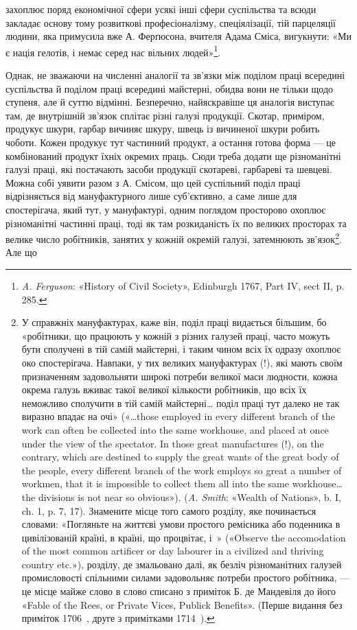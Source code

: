 \parcont{}  %
захоплює поряд економічної сфери усякі інші сфери суспільства
та всюди закладає основу тому розвиткові професіоналізму,
спеціялізації, тій парцеляції людини, яка примусила вже А. Ферґюсона,
вчителя Адама Сміса, вигукнути: «Ми є нація гелотів,
і немає серед нас вільних людей»\footnote{
\emph{A. Ferguson}: «History of Civil Society», Edinburgh 1767, Part IV,
sect II, p. 285.
}.

Однак, не зважаючи на численні аналогії та зв’язки між поділом
праці всередині суспільства й поділом праці всередині майстерні,
обидва вони не тільки щодо ступеня, але й суттю відмінні.
Безперечно, найяскравіше ця аналогія виступає там, де внутрішній
зв’язок сплітає різні галузі продукції. Скотар, приміром,
продукує шкури, гарбар вичиняє шкуру, швець із вичиненої
шкури робить чоботи. Кожен продукує тут частинний продукт,
а остання готова форма — це комбінований продукт їхніх окремих
праць. Сюди треба додати ще різноманітні галузі праці, які
постачають засоби продукції скотареві, гарбареві та шевцеві.
Можна собі уявити разом з А. Смісом, що цей суспільний поділ
праці відрізняється від мануфактурного лише суб’єктивно, а саме
лише для спостерігача, який тут, у мануфактурі, одним поглядом
просторово охоплює різноманітні частинні праці, тоді як там розкиданість
їх по великих просторах та велике число робітників,
занятих у кожній окремій галузі, затемнюють зв’язок\footnote{
У справжніх мануфактурах, каже він, поділ праці видається
більшим, бо «робітники, що працюють у кожній з різних галузей праці,
часто можуть бути сполучені в тій самій майстерні, і таким чином всіх
їх одразу охоплює око спостерігача. Навпаки, у тих великих мануфактурах
(!), які мають своїм призначенням задовольняти широкі потреби
великої маси людности, кожна окрема галузь вживає такої великої кількости
робітників, що всіх їх неможливо сполучити в тій самій майстерні\dots{}
поділ праці тут далеко не так виразно впадає на очі» («\dots{}those employed
in every different branch of the work can often be collected into the
same workhouse, and placed at once under the view of the spectator. In
those great manufactures (!), on the contrary, which are destined to supply
the great wants of the great body of the people, every different branch of
the work employs so great a number of workmen, that it is impossible
to collect them all into the same workhouse\dots{} the divisions is not near
so obvious»). (\emph{A. Smith}: «Wealth of Nations», b. I, ch. 1, p. 7, 17).
Знамените місце того самого розділу, яке починається словами:
«Погляньте на життєві умови простого ремісника або поденника в
цивілізованій країні, в країні, що процвітає, і~» («Observe the accomodation
of the most common artificer or day labourer in a civilized and
thriving country etc.»), розділу, де змальовано далі, як безліч різноманітних
галузей промисловості спільними силами задовольняє потреби
простого робітника, — це місце майже слово в слово списано з приміток
Б. де Мандевіля до його «Fable of the Rees, or Private Vices, Publick Benefits».
(Перше видання без приміток 1706~, друге з примітками 1714~).
}. Але що
